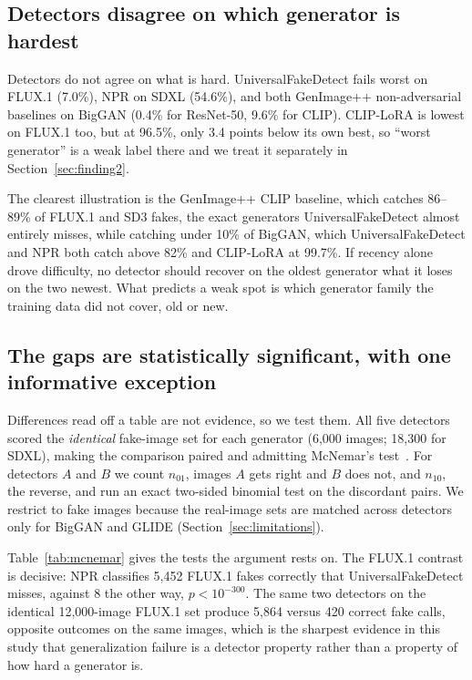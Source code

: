 \documentclass[3p,times,procedia]{elsarticle}
\begin{document}
\subsection{Detectors disagree on which generator is hardest}
\label{sec:finding1}

Detectors do not agree on what is hard. UniversalFakeDetect fails worst on
FLUX.1 (7.0\%), NPR on SDXL (54.6\%), and both GenImage++ non-adversarial
baselines on BigGAN (0.4\% for ResNet-50, 9.6\% for CLIP). CLIP-LoRA is
lowest on FLUX.1 too, but at 96.5\%, only 3.4 points below its own best, so
``worst generator'' is a weak label there and we treat it separately in
Section~\ref{sec:finding2}.

The clearest illustration is the GenImage++ CLIP baseline, which catches
86--89\% of FLUX.1 and SD3 fakes, the exact generators UniversalFakeDetect
almost entirely misses, while catching under 10\% of BigGAN, which
UniversalFakeDetect and NPR both catch above 82\% and CLIP-LoRA at 99.7\%.
If recency alone drove difficulty, no detector should recover on the oldest
generator what it loses on the two newest. What predicts a weak spot is
which generator family the training data did not cover, old or new.

\subsection{The gaps are statistically significant, with one informative
exception}
\label{sec:significance}

Differences read off a table are not evidence, so we test them. All five
detectors scored the \emph{identical} fake-image set for each generator
(6{,}000 images; 18{,}300 for SDXL), making the comparison paired and
admitting McNemar's test~\cite{mcnemar1947}. For detectors $A$ and $B$ we
count $n_{01}$, images $A$ gets right and $B$ does not, and $n_{10}$, the
reverse, and run an exact two-sided binomial test on the discordant pairs.
We restrict to fake images because the real-image sets are matched across
detectors only for BigGAN and GLIDE (Section~\ref{sec:limitations}).

Table~\ref{tab:mcnemar} gives the tests the argument rests on. The FLUX.1
contrast is decisive: NPR classifies 5{,}452 FLUX.1 fakes correctly that
UniversalFakeDetect misses, against 8 the other way, $p<10^{-300}$. The
same two detectors on the identical 12{,}000-image FLUX.1 set produce
5{,}864 versus 420 correct fake calls, opposite outcomes on the same
images, which is the sharpest evidence in this study that generalization
failure is a detector property rather than a property of how hard a
generator is.
\end{document}
